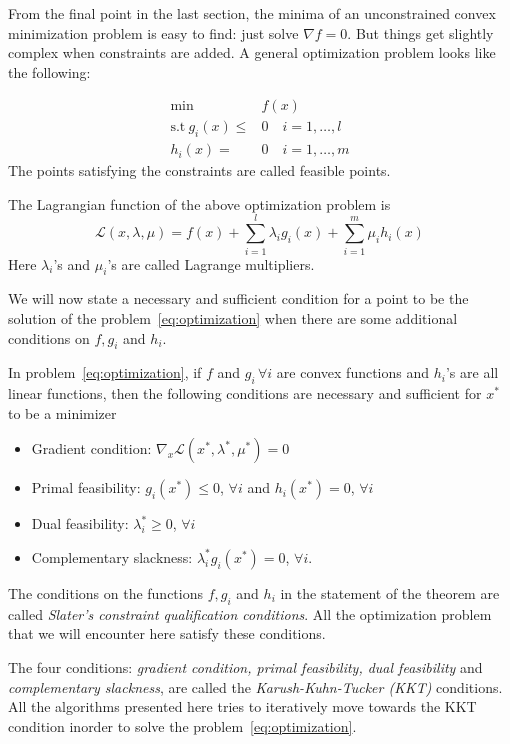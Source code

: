 From the final point in the last section, the minima of an
unconstrained convex minimization problem is easy to find:
just solve $\nabla f = 0$. But things get slightly complex
when constraints are added. A general optimization
problem looks like the following:

\begin{equation}\label{eq:optimization}
\begin{split}
\min& f(x)\\
\text{s.t}\ g_i(x)\leq& 0\quad i=1,\ldots,l\\
			h_i(x) = &0\quad i=1,\ldots,m
\end{split}
\end{equation}
The points satisfying the constraints are called feasible points.

The Lagrangian function of the above optimization problem is
\begin{equation*}
	\mathcal{L}(x, \lambda, \mu) = f(x) + \sum_{i=1}^l \lambda_i g_i(x)
	+ \sum_{i=1}^m \mu_i h_i(x)
\end{equation*}
Here $\lambda_i$'s and $\mu_i$'s are called Lagrange multipliers.

We will now state a necessary and sufficient condition for
a point to be the solution of the problem~\eqref{eq:optimization}
when there are some additional conditions on $f, g_i$ and $h_i$.

\begin{theorem}
	In problem~\eqref{eq:optimization}, if $f$ and $g_i\,\forall i$
	are convex functions and $h_i$'s are all linear functions,
	then the following conditions are necessary and sufficient
	for $x^*$ to be a minimizer
	\begin{itemize}
		\item Gradient condition: $\nabla_x\mathcal{L}
			(x^*, \lambda^*, \mu^*) = 0$

		\item Primal feasibility: $g_i(x^*)\leq 0$, $\forall i$ and
			$h_i(x^*) = 0$, $\forall i$

		\item Dual feasibility: $\lambda_i^*\geq 0$, $\forall i$

		\item Complementary slackness: $\lambda_i^*g_i(x^*) = 0$,
			$\forall i$.
	\end{itemize}
\end{theorem}

The conditions on the functions $f, g_i$ and $h_i$ in the
statement of the theorem
are called \emph{Slater's constraint qualification conditions}.
All the optimization problem that we will encounter here satisfy
these conditions.

The four conditions: \emph{gradient condition, primal feasibility,
dual feasibility} and \emph{complementary slackness}, are
called the \emph{Karush-Kuhn-Tucker (KKT)}
conditions. All the algorithms presented here
tries to iteratively move towards the KKT condition inorder
to solve the problem~\eqref{eq:optimization}.
